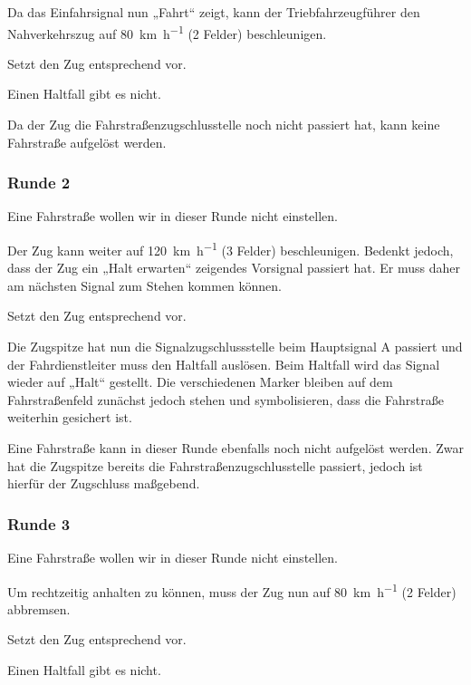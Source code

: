    Da das Einfahrsignal nun „Fahrt“ zeigt, kann der Triebfahrzeugführer den Nahverkehrszug auf \SI{80}{\kilo\metre\per\hour} (2 Felder) beschleunigen.

   Setzt den Zug entsprechend vor.

   Einen Haltfall gibt es nicht.

   Da der Zug die Fahrstraßenzugschlusstelle noch nicht passiert hat, kann keine Fahrstraße aufgelöst werden.


\subsubsection*{Runde 2}
   Eine Fahrstraße wollen wir in dieser Runde nicht einstellen.

   Der Zug kann weiter auf \SI{120}{\kilo\metre\per\hour} (3 Felder) beschleunigen. Bedenkt jedoch, dass der Zug ein „Halt erwarten“ zeigendes Vorsignal passiert hat. Er muss daher am nächsten Signal zum Stehen kommen können.
  
   Setzt den Zug entsprechend vor.

   Die Zugspitze hat nun die Signalzugschlussstelle beim Hauptsignal A passiert und der Fahrdienstleiter muss den Haltfall auslösen. Beim Haltfall wird das Signal wieder auf „Halt“ gestellt. Die verschiedenen Marker bleiben auf dem Fahrstraßenfeld zunächst jedoch stehen und symbolisieren, dass die Fahrstraße weiterhin gesichert ist.

   Eine Fahrstraße kann in dieser Runde ebenfalls noch nicht aufgelöst werden. Zwar hat die Zugspitze bereits die Fahrstraßenzugschlusstelle passiert, jedoch ist hierfür der Zugschluss maßgebend.


\subsubsection*{Runde 3}
   Eine Fahrstraße wollen wir in dieser Runde nicht einstellen.

   Um rechtzeitig anhalten zu können, muss der Zug nun auf \SI{80}{\kilo\metre\per\hour} (2 Felder) abbremsen.

   Setzt den Zug entsprechend vor.

   Einen Haltfall gibt es nicht.


